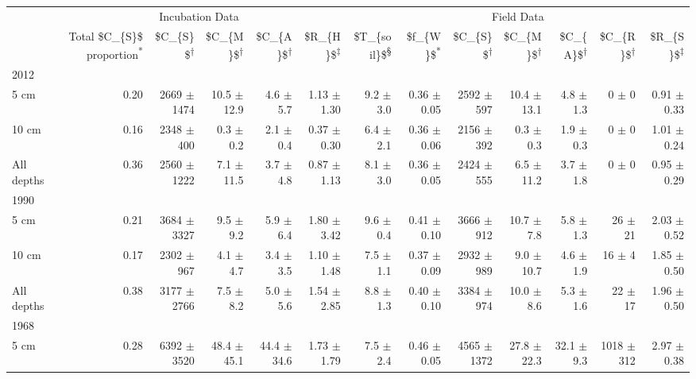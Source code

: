 \captionsetup[table]{labelformat=empty,skip=1pt}
\begin{longtable}{lrrrrrrrrrrrr}
\toprule
& \multicolumn{5}{c}{Incubation Data} & \multicolumn{7}{c}{Field Data} \\ 
 \cmidrule(lr){2-6}\cmidrule(lr){7-13}
 & Total \$C\_\{S\}\$ proportion\textsuperscript{*} & \$C\_\{S\}\$\textsuperscript{†} & \$C\_\{M\}\$\textsuperscript{†} & \$C\_\{A\}\$\textsuperscript{†} & \$R\_\{H\}\$\textsuperscript{‡} & \$T\_\{soil\}\$\textsuperscript{§} & \$f\_\{W\}\$\textsuperscript{*} & \$C\_\{S\}\$\textsuperscript{†} & \$C\_\{M\}\$\textsuperscript{†} & \$C\_\{A\}\$\textsuperscript{†} & \$C\_\{R\}\$\textsuperscript{†} & \$R\_\{S\}\$\textsuperscript{‡} \\ 
\midrule
\multicolumn{1}{l}{2012} \\ 
\midrule
5 cm & 0.20 & 2669 $\pm$ 1474 & 10.5 $\pm$ 12.9 & 4.6 $\pm$ 5.7 & 1.13 $\pm$ 1.30 & 9.2 $\pm$ 3.0 & 0.36 $\pm$ 0.05 & 2592 $\pm$ 597 & 10.4 $\pm$ 13.1 & 4.8 $\pm$ 1.3 & 0 $\pm$ 0 & 0.91 $\pm$ 0.33 \\ 
10 cm & 0.16 & 2348 $\pm$ 400 & 0.3 $\pm$ 0.2 & 2.1 $\pm$ 0.4 & 0.37 $\pm$ 0.30 & 6.4 $\pm$ 2.1 & 0.36 $\pm$ 0.06 & 2156 $\pm$ 392 & 0.3 $\pm$ 0.3 & 1.9 $\pm$ 0.3 & 0 $\pm$ 0 & 1.01 $\pm$ 0.24 \\ 
All depths & 0.36 & 2560 $\pm$ 1222 & 7.1 $\pm$ 11.5 & 3.7 $\pm$ 4.8 & 0.87 $\pm$ 1.13 & 8.1 $\pm$ 3.0 & 0.36 $\pm$ 0.05 & 2424 $\pm$ 555 & 6.5 $\pm$ 11.2 & 3.7 $\pm$ 1.8 & 0 $\pm$ 0 & 0.95 $\pm$ 0.29 \\ 
\midrule
\multicolumn{1}{l}{1990} \\ 
\midrule
5 cm & 0.21 & 3684 $\pm$ 3327 & 9.5 $\pm$ 9.2 & 5.9 $\pm$ 6.4 & 1.80 $\pm$ 3.42 & 9.6 $\pm$ 0.4 & 0.41 $\pm$ 0.10 & 3666 $\pm$ 912 & 10.7 $\pm$ 7.8 & 5.8 $\pm$ 1.3 & 26 $\pm$ 21 & 2.03 $\pm$ 0.52 \\ 
10 cm & 0.17 & 2302 $\pm$ 967 & 4.1 $\pm$ 4.7 & 3.4 $\pm$ 3.5 & 1.10 $\pm$ 1.48 & 7.5 $\pm$ 1.1 & 0.37 $\pm$ 0.09 & 2932 $\pm$ 989 & 9.0 $\pm$ 10.7 & 4.6 $\pm$ 1.9 & 16 $\pm$ 4 & 1.85 $\pm$ 0.50 \\ 
All depths & 0.38 & 3177 $\pm$ 2766 & 7.5 $\pm$ 8.2 & 5.0 $\pm$ 5.6 & 1.54 $\pm$ 2.85 & 8.8 $\pm$ 1.3 & 0.40 $\pm$ 0.10 & 3384 $\pm$ 974 & 10.0 $\pm$ 8.6 & 5.3 $\pm$ 1.6 & 22 $\pm$ 17 & 1.96 $\pm$ 0.50 \\ 
\midrule
\multicolumn{1}{l}{1968} \\ 
\midrule
5 cm & 0.28 & 6392 $\pm$ 3520 & 48.4 $\pm$ 45.1 & 44.4 $\pm$ 34.6 & 1.73 $\pm$ 1.79 & 7.5 $\pm$ 2.4 & 0.46 $\pm$ 0.05 & 4565 $\pm$ 1372 & 27.8 $\pm$ 22.3 & 32.1 $\pm$ 9.3 & 1018 $\pm$ 312 & 2.97 $\pm$ 0.38 \\ 

\end{longtable}
